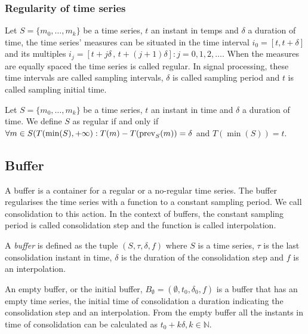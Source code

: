 \subsubsection{Regularity of time series} 

Let $S=\{m_0,\ldots,m_k\}$ be a time series, $t$ an instant in temps
and $\delta$ a duration of time, the time series' measures can be
situated in the time interval $i_0=[t,t+\delta]$ and its multiples
$i_j=[t+j\delta \,,\, t+(j+1)\delta]: j=0,1,2,\ldots$. When the
measures are equally spaced the time series is called regular. In
signal processing, these time intervals are called sampling intervals,
$\delta$ is called sampling period and $t$ is called sampling initial
time.

\begin{definition}
  Let $S=\{m_0,\ldots,m_k\}$ be a time series, $t$ an instant in time
  and $\delta$ a duration of time. We define $S$ as regular if and
  only if $\forall m \in S(T(\min(S),+\infty):T(m) - T(\operatorname*{prev}_S(m)) =
  \delta$ and $T(\min(S))=t$.
\end{definition}




\subsection{Buffer}\label{sec:model:buffer}

A buffer is a container for a regular or a no-regular time series. The
buffer regularises the time series with a function to a constant
sampling period. We call consolidation to this action. In the context
of buffers, the constant sampling period is called consolidation step
and the function is called interpolation.

\begin{definition}[Buffer]
  A \emph{buffer} is defined as the tuple $(S,\tau,\delta,f)$ where
  $S$ is a time series, $\tau$ is the last consolidation instant in
  time, $\delta$ is the duration of the consolidation step and $f$ is
  an interpolation.
\end{definition}

An empty buffer, or the initial buffer, $B_{\emptyset} =
(\emptyset,t_0, \delta_0, f)$ is a buffer that has an empty time
series, the initial time of consolidation a duration indicating the
consolidation step and an interpolation. From the empty buffer all the
instants in time of consolidation can be calculated as $t_0+k\delta,
k\in\mathbb{N}$. 

